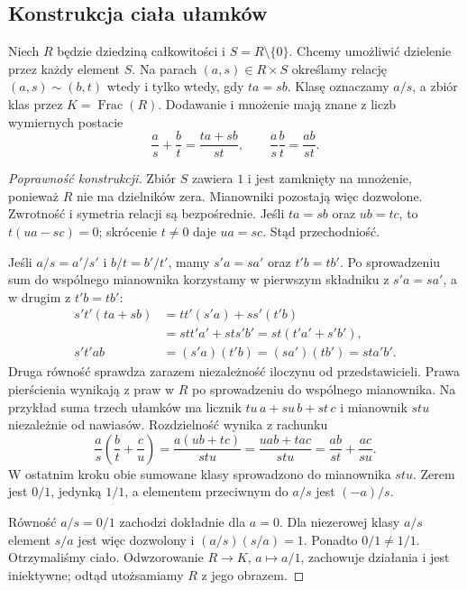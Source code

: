 \subsection*{Konstrukcja ciała ułamków}

\begin{definicja}
\label{def:cialo-ulamkow-5}
Niech $R$ będzie dziedziną całkowitości i $S=R\setminus\{0\}$.
Chcemy umożliwić dzielenie przez każdy element $S$.
Na parach $(a,s)\in R\times S$ określamy relację
$(a,s)\sim(b,t)$ wtedy i tylko wtedy, gdy $ta=sb$.
Klasę oznaczamy $a/s$, a zbiór klas przez $K=\operatorname{Frac}(R)$.
Dodawanie i mnożenie mają znane z liczb wymiernych postacie
\[
 \frac as+\frac bt=\frac{ta+sb}{st},\qquad
 \frac as\frac bt=\frac{ab}{st}.
\]
\end{definicja}

\begin{proof}[Poprawność konstrukcji]
Zbiór $S$ zawiera $1$ i jest zamknięty na mnożenie, ponieważ $R$
nie ma dzielników zera. Mianowniki pozostają więc dozwolone.
Zwrotność i symetria relacji są bezpośrednie. Jeśli $ta=sb$ oraz
$ub=tc$, to $t(ua-sc)=0$; skrócenie $t\ne0$ daje $ua=sc$.
Stąd przechodniość.

Jeśli $a/s=a'/s'$ i $b/t=b'/t'$, mamy $s'a=sa'$ oraz $t'b=tb'$.
Po sprowadzeniu sum do wspólnego mianownika korzystamy
w pierwszym składniku z $s'a=sa'$, a w drugim z $t'b=tb'$:
\[
 \begin{aligned}
 s't'(ta+sb)
 &=tt'(s'a)+ss'(t'b)\\
 &=stt'a'+sts'b'=st(t'a'+s'b'),\\
 s't'ab&=(s'a)(t'b)=(sa')(tb')=sta'b'.
 \end{aligned}
\]
Druga równość sprawdza zarazem niezależność iloczynu od przedstawicieli.
Prawa pierścienia wynikają z praw w $R$ po sprowadzeniu do wspólnego
mianownika. Na przykład suma trzech ułamków ma licznik
$tu\,a+su\,b+st\,c$ i mianownik $stu$ niezależnie od nawiasów.
Rozdzielność wynika z rachunku
\[
 \frac as\left(\frac bt+\frac cu\right)
 =\frac{a(ub+tc)}{stu}
 =\frac{uab+tac}{stu}
 =\frac{ab}{st}+\frac{ac}{su}.
\]
W ostatnim kroku obie sumowane klasy sprowadzono do mianownika $stu$.
Zerem jest $0/1$, jedynką $1/1$, a elementem przeciwnym do $a/s$ jest $(-a)/s$.

Równość $a/s=0/1$ zachodzi dokładnie dla $a=0$.
Dla niezerowej klasy $a/s$ element $s/a$ jest więc dozwolony
i $(a/s)(s/a)=1$. Ponadto $0/1\ne1/1$. Otrzymaliśmy ciało.
Odwzorowanie $R\to K$, $a\mapsto a/1$, zachowuje działania i jest
iniektywne; odtąd utożsamiamy $R$ z jego obrazem.
\end{proof}

